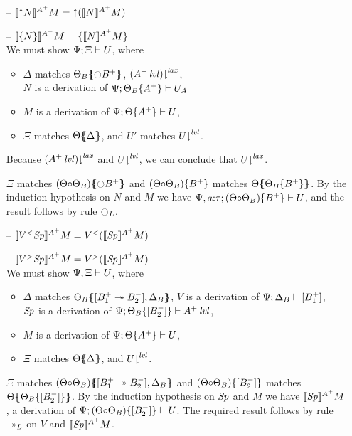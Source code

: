 \begin{itemize}
\item[--] $\lsubsta{\tupl{N}}{M}{A^+} = \tupl{(\lsubsta{N}{M}{A^+})}$
\item[--] $\lsubsta{\tlaxl{N}}{M}{A^+} = \tlaxl{\lsubsta{N}{M}{A^+}}$\smallskip\\
  We must show $\foc{\Psi}{\Xi}{U}$, where
  \begin{itemize}
  \item $\Delta$ matches $\frameoff{\Theta_B}{{\ocircle}B^+}$, 
     $\restrictfrom{(\islvl{A^+})}{\mlax}$,\\
     $N$ is a derivation of $\foc{\Psi}{\tackon{\Theta_B}{A^+}}{U_A}$
  \item $M$ is a derivation of $\foc{\Psi}{\tackon{\Theta}{A^+}}{U}$,
  \item $\Xi$ matches $\frameoff{\Theta}{\Delta}$, and $U'$ matches 
     $\restrictfrom{U}{\mlvl}$.
  \end{itemize}
  Because $\restrictfrom{(\islvl{A^+})}{\mlax}$ and $\restrictfrom{U}{\mlvl}$, 
  we can conclude that 
  $\restrictfrom{U}{\mlax}$. 

  $\Xi$ matches $\frameoff{(\Theta{\circ}\Theta_B)}{{\ocircle}B^+}$
  and $\tackon{(\Theta{\circ}\Theta_B)}{B^+}$ matches 
  $\frameoff{\Theta}{\tackon{\Theta_B}{B^+}}$.
  By the induction hypothesis on $N$ and $M$ we have
  $\foc{\Psi, a{:}\tau}{\tackon{(\Theta{\circ}\Theta_B)}{B^+}}{U}$,
  and the result follows by rule ${\ocircle}_L$.  \smallskip

\item[--] $\lsubsta{\tappl{V}{\Sp}}{M}{A^+} 
           = \tappl{V}{(\lsubsta{\Sp}{M}{A^+})}$
\item[--] $\lsubsta{\tappr{V}{\Sp}}{M}{A^+} 
           = \tappr{V}{(\lsubsta{\Sp}{M}{A^+})}$\smallskip\\
  We must show $\foc{\Psi}{\Xi}{U}$, where
  \begin{itemize}
  \item $\Delta$ matches 
     $\frameoff{\Theta_B}{\matchconj{[B_1^+ \righti B_2^-]}{\Delta_B}}$,
     $V$ is a derivation of $\foc{\Psi}{\Delta_B}{[B_1^+]}$, \\
     $\Sp$ is a derivation of 
     $\foc{\Psi}{\tackon{\Theta_B}{[B_2^-]}}{\islvl{A^+}}$,
  \item $M$ is a derivation of $\foc{\Psi}{\tackon{\Theta}{A^+}}{U}$,
  \item $\Xi$ matches $\frameoff{\Theta}{\Delta}$, and 
     $\restrictfrom{U}{\mlvl}$.
  \end{itemize}
  $\Xi$ matches 
  $\frameoff{(\Theta{\circ}\Theta_B)}
    {\matchconj{[B_1^+ \righti B_2^-]}{\Delta_B}}$
  and $\tackon{(\Theta{\circ}\Theta_B)}{[B_2^-]}$ matches 
  $\frameoff{\Theta}{\tackon{\Theta_B}{[B_2^-]}}$.
  By the induction hypothesis on $\Sp$ and $M$ we have
  $\lsubsta{\Sp}{M}{A^+}$, a derivation of
  $\foc{\Psi}{\tackon{(\Theta{\circ}\Theta_B)}{[B_2^-]}}{U}$.
  The required result follows by rule ${\righti}_L$ on $V$ and 
  $\lsubsta{\Sp}{M}{A^+}$.  \smallskip


\end{itemize}
